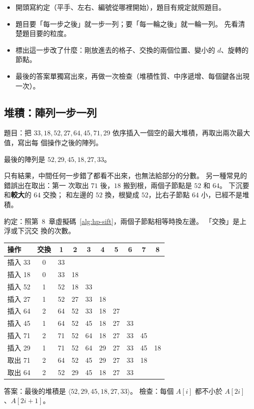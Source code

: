 \begin{itemize}
\item 開頭寫約定（平手、左右、編號從哪裡開始），題目有規定就照題目。
\item 題目要「每一步之後」就一步一列；要「每一輪之後」就一輪一列。 先看清楚題目要的粒度。
\item 標出這一步改了什麼：剛放進去的格子、交換的兩個位置、變小的 $d$、旋轉的節點。
\item 最後的答案單獨寫出來，再做一次檢查（堆積性質、中序遞增、每個鍵各出現一次）。
\end{itemize}

\subsection{堆積：陣列一步一列}

題目：把 $33, 18, 52, 27, 64, 45, 71, 29$ 依序插入一個空的最大堆積，再取出兩次最大值，寫出每
個操作之後的陣列。

\begin{exmbad}
最後的陣列是 $52, 29, 45, 18, 27, 33$。
\end{exmbad}

只有結果，中間任何一步錯了都看不出來，也無法給部分的分數。 另一種常見的錯誤出在取出：第一
次取出 $71$ 後，$18$ 搬到根，兩個子節點是 $52$ 和 $64$。 下沉要和\textbf{較大}的 $64$ 交換；
和左邊的 $52$ 換，根變成 $52$，比右子節點 $64$ 小，已經不是堆積。

\begin{exmgood}
約定：照第~8~章虛擬碼~\ref{alg:hp-sift}，兩個子節點相等時換左邊。 「交換」是上浮或下沉交
換的次數。
\begin{center}
\small
\begin{tabular}{lc*{8}{c}}
\toprule
操作 & 交換 & 1 & 2 & 3 & 4 & 5 & 6 & 7 & 8 \\
\midrule
插入 33 & 0 & 33 \\
插入 18 & 0 & 33 & 18 \\
插入 52 & 1 & 52 & 18 & 33 \\
插入 27 & 1 & 52 & 27 & 33 & 18 \\
插入 64 & 2 & 64 & 52 & 33 & 18 & 27 \\
插入 45 & 1 & 64 & 52 & 45 & 18 & 27 & 33 \\
插入 71 & 2 & 71 & 52 & 64 & 18 & 27 & 33 & 45 \\
插入 29 & 1 & 71 & 52 & 64 & 29 & 27 & 33 & 45 & 18 \\
\midrule
取出 71 & 2 & 64 & 52 & 45 & 29 & 27 & 33 & 18 \\
取出 64 & 2 & 52 & 29 & 45 & 18 & 27 & 33 \\
\bottomrule
\end{tabular}
\end{center}
答案：最後的堆積是 $\langle 52, 29, 45, 18, 27, 33 \rangle$。 檢查：每個 $A[i]$ 都不小於
$A[2i]$、$A[2i+1]$。
\end{exmgood}

